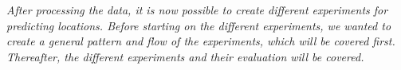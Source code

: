 \textit{After processing the data, it is now possible to create different experiments for predicting locations. Before starting on the different experiments, we wanted to create a general pattern and flow of the experiments, which will be covered first. Thereafter, the different experiments and their evaluation will be covered.}